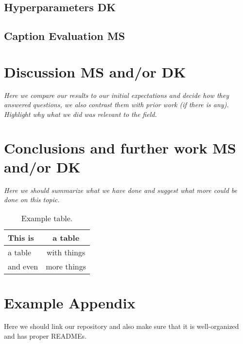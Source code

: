 \documentclass[11pt]{article}
\begin{document}
\subsection{Hyperparameters \textbf{DK}}

\subsection{Caption Evaluation \textbf{MS}}

\section{Discussion \textbf{MS and/or DK}}

\textit{Here we compare our results to our initial expectations and decide how they answered questions, we also contrast them with prior work (if there is any). Highlight why what we did was relevant to the field.}

\section{Conclusions and further work \textbf{MS and/or DK}}

\textit{Here we should summarize what we have done and suggest what more could be done on this topic.}

\begin{table}
\centering
\begin{tabular}{lc}
\hline
\textbf{This is} & \textbf{a table}\\
\hline
a table & with things \\
and even & more things  \\\hline
\end{tabular}
\caption{Example table.}
\label{tab:accents}
\end{table}



\appendix

\section{Example Appendix}
\label{sec:appendix}

Here we should link our repository and also make sure that it is well-organized and has proper READMEs.
\end{document}
